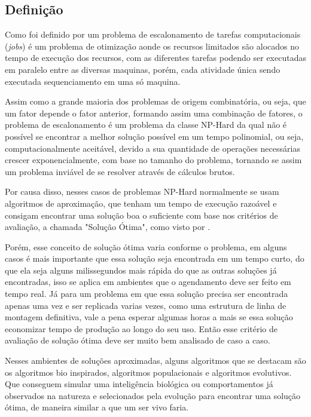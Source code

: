    \subsection{Definição}
        Como foi definido por \cite{Bagchi1999} um problema de escalonamento de tarefas computacionais (\textit{jobs}) é um problema de otimização aonde os recursos limitados são alocados no tempo de execução dos recursos, com as diferentes tarefas podendo ser executadas em paralelo entre as diversas maquinas, porém, cada atividade única sendo executada sequenciamento em uma só maquina.\newline

        Assim como a grande maioria dos problemas de origem combinatória, ou seja, que um fator depende o fator anterior, formando assim uma combinação de fatores, o problema de escalonamento é um problema da classe NP-Hard da qual não é possível se encontrar a melhor solução possível em um tempo polinomial, ou seja, computacionalmente aceitável, devido a sua quantidade de operações necessárias crescer exponencialmente, com base no tamanho do problema, tornando se assim um problema inviável de se resolver através de cálculos brutos.\newline

        Por causa disso, nesses casos de problemas NP-Hard normalmente se usam algoritmos de aproximação, que tenham um tempo de execução razoável e consigam encontrar uma solução boa o suficiente com base nos critérios de avaliação, a chamada "Solução Ótima", como visto por \cite{lawler1993}.\newline

        Porém, esse conceito de solução ótima varia conforme o problema, em alguns casos é mais importante que essa solução seja encontrada em um tempo curto, do que ela seja alguns milissegundos mais rápida do que as outras soluções já encontradas, isso se aplica em ambientes que o agendamento deve ser feito em tempo real.\newline
        Já para um problema em que essa solução precisa ser encontrada apenas uma vez e ser replicada varias vezes, como uma estrutura de linha de montagem definitiva, vale a pena esperar algumas horas a mais se essa solução economizar tempo de produção ao longo do seu uso. Então esse critério de avaliação de solução ótima deve ser muito bem analisado de caso a caso.\newline

        Nesses ambientes de soluções aproximadas, alguns algoritmos que se destacam são os algoritmos bio inspirados, algoritmos populacionais e algoritmos evolutivos. Que conseguem simular uma inteligência biológica ou comportamentos já observados na natureza e selecionados pela evolução para encontrar uma solução ótima, de maneira similar a que um ser vivo faria.


